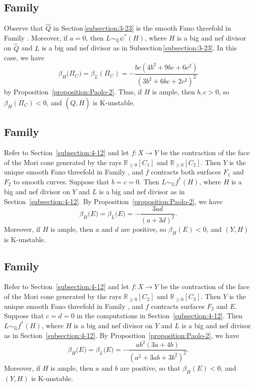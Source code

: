 \documentclass[12pt]{amsart}
\theoremstyle{definition}
\theoremstyle{remark}
\begin{document}
\subsection{Family }
\label{subsection:2-31}
Observe that $\widehat{Q}$ in Section\,\ref{subsection:3-23} is the smooth Fano threefold in Family . Moreover, if $a=0$, then $L\sim_{\mathbb{Q}} \psi^*(H)$,
where $H$ is a big and nef divisor on $\widehat{Q}$ and $L$ is a big and nef divisor as in Subsection\,\ref{subsection:3-23}. In this case, we have
$$
\beta_H\big(\Pi_C\big)=\beta_L(\Pi_C)=-\frac{bc(4b^2+9bc+6c^2)}{(3b^2+6bc+2c^2)^2}
$$
by Proposition~\ref{proposition:Paolo-2}. Thus, if $H$ is ample, then $b,c>0$, so $\beta_H(\Pi_C)<0$, and $(\widehat{Q},H)$ is K-unstable.

\subsection{Family }
\label{subsection:2-33}
Refer to Section~\ref{subsection:4-12} and
let $f\colon X\to Y$ be the contraction of the face of the Mori cone generated by the rays $\mathbb{R}_{\geqslant 0}[C_1]$ and $\mathbb{R}_{\geqslant 0}[C_2]$. Then $Y$ is the unique smooth Fano threefold in Family , and $f$ contracts both surfaces $F_1$ and $F_2$ to smooth curves. Suppose that $b=c=0$. Then $L\sim_{\mathbb{Q}} f^*(H)$, where $H$ is a big and nef divisor on $Y$ and $L$ is a big and nef  divisor as in Section~\ref{subsection:4-12}. By Proposition~\ref{proposition:Paolo-2}, we have
$$
\beta_H\big(E\big)=\beta_L\big(E\big)=-\frac{3ad}{(a+3d)^2}.
$$
Moreover, if $H$ is ample, then $a$ and $d$ are positive, so $\beta_H(E)<0$, and $(Y,H)$ is K-unstable.

\subsection{Family }
\label{subsection:2-35}
Refer to Section~\ref{subsection:4-12} and let $f\colon X\to Y$ be the contraction of the face of the Mori cone generated by the rays $\mathbb{R}_{\geqslant 0}[C_2]$ and $\mathbb{R}_{\geqslant 0}[C_3]$. Then $Y$ is the unique smooth Fano threefold in Family , and $f$ contracts surfaces $F_2$ and $E$. Suppose that $c=d=0$ in the computations in Section~\ref{subsection:4-12}. Then $L\sim_{\mathbb{Q}} f^*(H)$, where $H$ is a big and nef divisor on $Y$ and $L$ is a  big and nef divisor as in Section~\ref{subsection:4-12}. By Proposition~\ref{proposition:Paolo-2}, we have
$$
\beta_H\big(E\big)=\beta_L\big(E\big)=-\frac{ab^2(3a+4b)}{(a^2+3ab+3b^2)^2}.
$$
Moreover, if $H$ is ample, then $a$ and $b$ are positive, so that $\beta_H(E)<0$, and $(Y,H)$ is K-unstable.
\end{document}

